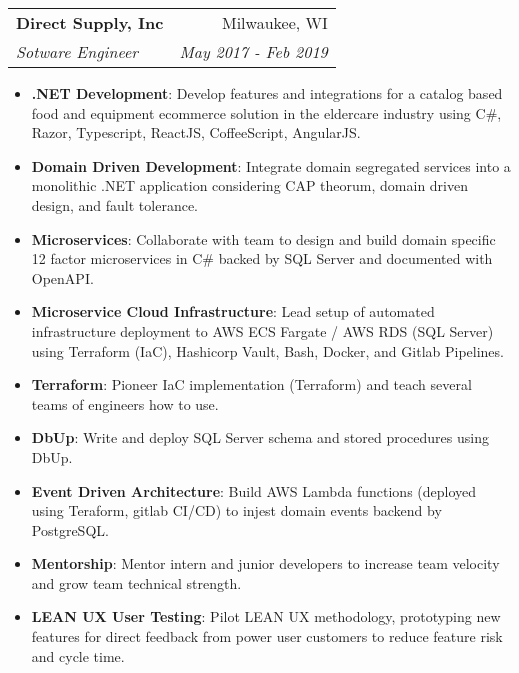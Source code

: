 \documentclass[letterpaper,11pt]{article}
\makeatletter
\newcommand{\resumeItem}[2]{
  \item\small{
    \textbf{#1}{: #2 \vspace{-2pt}}
  }
}
\newcommand{\resumeSubheading}[4]{
  \vspace{-1pt}\item
    \begin{tabular*}{0.97\textwidth}{l@{\extracolsep{\fill}}r}
      \textbf{#1} & #2 \\
      \textit{\small#3} & \textit{\small #4} \\
    \end{tabular*}\vspace{-5pt}
}
\newcommand{\resumeItemListStart}{\begin{itemize}}
\newcommand{\resumeItemListEnd}{\end{itemize}\vspace{-5pt}}
\makeatother
\begin{document}
    \resumeSubheading
      {Direct Supply, Inc}{Milwaukee, WI}
      {Sotware Engineer}{May 2017 - Feb 2019}
      \resumeItemListStart
        \resumeItem{.NET Development}
          {Develop features and integrations for a catalog based food and equipment ecommerce solution in the eldercare industry using C\#, Razor, Typescript, ReactJS, CoffeeScript, AngularJS.}
        \resumeItem{Domain Driven Development}
          {Integrate domain segregated services into a monolithic .NET application considering CAP theorum, domain driven design, and fault tolerance.}
        \resumeItem{Microservices}
          {Collaborate with team to design and build domain specific 12 factor microservices in C\# backed by SQL Server and documented with OpenAPI.}
        \resumeItem{Microservice Cloud Infrastructure}
          {Lead setup of automated infrastructure deployment to AWS ECS Fargate / AWS RDS (SQL Server) using Terraform (IaC), Hashicorp Vault, Bash, Docker, and Gitlab Pipelines.}
        \resumeItem{Terraform}
          {Pioneer IaC implementation (Terraform) and teach several teams of engineers how to use.}
        \resumeItem{DbUp}
          {Write and deploy SQL Server schema and stored procedures using DbUp.}
        \resumeItem{Event Driven Architecture}
          {Build AWS Lambda functions (deployed using Teraform, gitlab CI/CD) to injest domain events backend by PostgreSQL.}
        \resumeItem{Mentorship}
          {Mentor intern and junior developers to increase team velocity and grow team technical strength.}
        \resumeItem{LEAN UX User Testing}
          {Pilot LEAN UX methodology, prototyping new features for direct feedback from power user customers to reduce feature risk and cycle time.}

      \resumeItemListEnd
\end{document}
